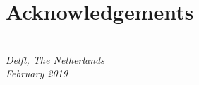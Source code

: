 \chapter*{Acknowledgements}







\begin{flushright}
{\makeatletter\itshape
    \@author \\
    Delft, The Netherlands \\
    February 2019
\makeatother}
\end{flushright}
